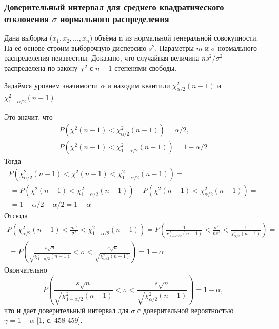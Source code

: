 \documentclass[12pt]{article}
\begin{document}
	\subsubsection{Доверительный интервал для среднего квадратического отклонения $\sigma$ нормального распределения}
	Дана выборка ($x_{1},x_{2}, ... ,x_{n}$) объёма n из нормальной генеральной совокупности. На её основе строим выборочную дисперсию $s^{2}$. Параметры $m$ и $\sigma$ нормального распределения неизвестны. Доказано, что случайная величина $ns^{2}/\sigma^{2}$ распределена по закону $\chi^{2}$ с $n-1$ степенями свободы.
	
	Задаёмся уровнем значимости $\alpha$ и находим квантили $\chi^{2}_{\alpha/2}(n-1)$ и $\chi^{2}_{1-\alpha/2}(n-1)$.
	
	Это значит, что 
	\begin{equation}
		\begin{split}
			P\left(\chi^{2}(n-1) < \chi^{2}_{\alpha/2}(n-1)\right) = \alpha/2, \\
			P\left(\chi^{2}(n-1) < \chi^{2}_{1-\alpha/2}(n-1)\right) = 1-\alpha/2
		\end{split}
		\label{P_chi_2x2}        
	\end{equation}
	Тогда
	\begin{multline}
		P\left(\chi^{2}_{\alpha/2}(n-1) < \chi^{2}(n-1) < \chi^{2}_{1-\alpha/2}(n-1)\right) = \\\ =
		P\left(\chi^{2}(n-1) < \chi^{2}_{1-\alpha/2}(n-1)\right) -P\left(\chi^{2}(n-1) < \chi^{2}_{\alpha/2}(n-1)\right) = \\\ = 1 - \alpha/2 -\alpha/2 = 1 - \alpha
		\label{P_chi_2}
	\end{multline}
	Отсюда
	\begin{multline}
		P\left(\chi^{2}_{\alpha/2}(n-1) < \frac{ns^{2}}{\sigma^{2}} < \chi^{2}_{1-\alpha/2}(n-1)\right) =
		P\left(\frac{1}{\chi^{2}_{1-\alpha/2}(n-1)} < \frac{\sigma^{2}}{ns^{2}} < \frac{1}{\chi^{2}_{\alpha/2}(n-1)} \right) = \\\ =
		P\left(\frac{s\sqrt{n}}{\sqrt{\chi^{2}_{1-\alpha/2}(n-1)}} < \sigma <  \frac{s\sqrt{n}}{\sqrt{\chi^{2}_{\alpha/2}(n-1)}}\right) = 1- \alpha
		\label{interv}
	\end{multline}
	Окончательно
	\begin{equation}
		P\left(\frac{s\sqrt{n}}{\sqrt{\chi^{2}_{1-\alpha/2}(n-1)}} < \sigma <  \frac{s\sqrt{n}}{\sqrt{\chi^{2}_{\alpha/2}(n-1)}}\right) = 1- \alpha,
		\label{fin_interval}
	\end{equation}
	что и даёт доверительный интервал для $\sigma$ с доверительной вероятностью $\gamma = 1 - \alpha$ [1, с. 458-459].
	
\end{document}
